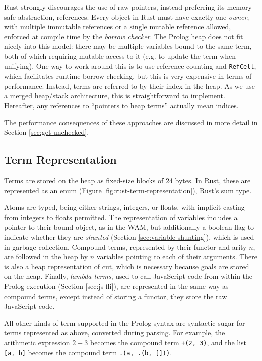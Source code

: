Rust strongly discourages the use of raw pointers, instead preferring its memory-safe abstraction, references. Every object in Rust must have exactly one \emph{owner}, with multiple immutable references or a single mutable reference allowed, enforced at compile time by the \emph{borrow checker}. The Prolog heap does not fit nicely into this model: there may be multiple variables bound to the same term, both of which requiring mutable access to it (e.g. to update the term when unifying). One way to work around this is to use reference counting and \texttt{RefCell}, which facilitates runtime borrow checking, but this is very expensive in terms of performance. Instead, terms are referred to by their index in the heap. As we use a merged heap/stack architecture, this is straightforward to implement. Hereafter, any references to ``pointers to heap terms'' actually mean indices.

The performance consequences of these approaches are discussed in more detail in Section \ref{sec:get-unchecked}.

\subsection{Term Representation}

\label{sec:term-representation}

Terms are stored on the heap as fixed-size blocks of 24 bytes. In Rust, these are represented as an enum (Figure \ref{fig:rust-term-representation}), Rust's sum type.

Atoms are typed, being either strings, integers, or floats, with implicit casting from integers to floats permitted. The representation of variables includes a pointer to their bound object, as in the WAM, but additionally a boolean flag to indicate whether they are \emph{shunted} (Section \ref{sec:variable-shunting}), which is used in garbage collection. Compound terms, represented by their functor and arity $n$, are followed in the heap by $n$ variables pointing to each of their arguments. There is also a heap representation of cut, which is necessary because goals are stored on the heap. Finally, \emph{lambda terms}, used to call JavaScript code from within the Prolog execution (Section \ref{sec:js-ffi}), are represented in the same way as compound terms, except instead of storing a functor, they store the raw JavaScript code.

All other kinds of term supported in the Prolog syntax are syntactic sugar for terms represented as above, converted during parsing. For example, the arithmetic expression $2 + 3$ becomes the compound term \texttt{+(2, 3)}, and the list \texttt{[a, b]} becomes the compound term \texttt{.(a, .(b, []))}.

